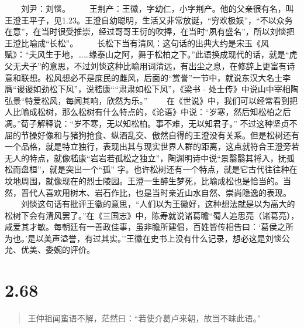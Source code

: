 \documentclass[]{book}
\begin{document}
　　刘尹：刘惔。
　　王荆产：王徽，字幼仁，小字荆产。他的父亲很有名，叫王澄王平子，见1.23。王澄自幼聪明，生活又非常放诞，``穷欢极娱''，``不以众务在意''，在当时很受推崇，经过哥哥王衍的吹捧，在当时``夙有盛名''，所以刘惔把王澄比喻成``长松''。
　　长松下当有清风：这句话的出典大约是宋玉《风赋》：``夫风生于地，\ldots{}\ldots{}缘泰山之阿，舞于松柏之下。''此语换成现代的话，就是``虎父无犬子''的意思，不过刘惔这种比喻用词清远，有出尘之息，在修辞上更富有诗意和联想。松风想必不是庶民的雌风，后面的``赏誉''一节中，就说东汉大名士李膺``谡谡如劲松下风''，说嵇康````肃肃如松下风''，《梁书
- 处士传》中说山中宰相陶弘景``特爱松风，每闻其响，欣然为乐。''
　　在《世说》中，我们可以经常看到把人比喻成松树，那么松树有什么特点的，《论语》中说：``岁寒，然后知松柏之后凋。''荀子解释说：``岁不寒，无以知松柏。事不难，无以知君子。''
不过这种坚贞不屈的节操好像和与猪狗抢食、纵酒乱交、傲然自得的王澄没有关系。但是松树还有一个品格，就是特立独行，表现出其与现实世界人群的距离，这点就符合王澄旁若无人的特点，就像嵇康``岩岩若孤松之独立''，陶渊明诗中说``景翳翳其将入，抚孤松而盘桓''，就是突出一个``孤''
字。也许松树还有一个特点，就是它古代往往种在坟地周围，就像现在的烈士陵园。王澄一生醉生梦死，比喻成松也是恰当的。当然，晋代人喜欢用树木、岩石作比，也是当时亲近山水自然、崇尚隐逸的表现。
　　刘惔这句话有批评王徽的意思，``人们以为王徽好，这种想法就是以为高大的松树下会有清风罢了。''在《三国志》中，陈寿就说诸葛瞻``蜀人追思亮（诸葛亮），咸爱其才敏。每朝廷有一善政佳事，虽非瞻所建倡，百姓皆传相告曰：`葛侯之所为也。'是以美声溢誉，有过其实。''王徽在史书上没有什么记录，想必这是刘惔公允、优美、委婉的评价。　

\section{2.68}\label{section-114}

\begin{quote}
王仲祖闻蛮语不解，茫然曰：``若使介葛卢来朝，故当不昧此语。''
\end{quote}
\end{document}
